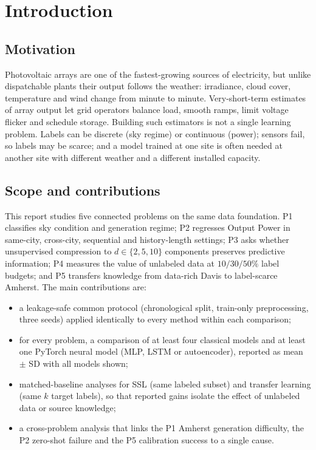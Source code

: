 \documentclass[11pt,letterpaper]{article}
\begin{document}
\section{Introduction}
\subsection{Motivation}
Photovoltaic arrays are one of the fastest-growing sources of electricity, but unlike
dispatchable plants their output follows the weather: irradiance, cloud cover, temperature and
wind change from minute to minute. Very-short-term estimates of array output let grid operators
balance load, smooth ramps, limit voltage flicker and schedule storage.
Building such estimators is not a single learning problem. Labels can be discrete (sky regime)
or continuous (power); sensors fail, so labels may be scarce; and a model trained at one site is
often needed at another site with different weather and a different installed capacity.

\subsection{Scope and contributions}
This report studies five connected problems on the same data foundation. P1 classifies sky
condition and generation regime; P2 regresses Output Power in same-city, cross-city, sequential
and history-length settings; P3 asks whether unsupervised compression to $d\in\{2,5,10\}$
components preserves predictive information; P4 measures the value of unlabeled data at
$10/30/50\%$ label budgets; and P5 transfers knowledge from data-rich Davis to label-scarce
Amherst. The main contributions are:
\begin{itemize}[leftmargin=1.5em,itemsep=2pt]
\item a leakage-safe common protocol (chronological split, train-only preprocessing, three seeds)
applied identically to every method within each comparison;
\item for every problem, a comparison of at least four classical models and at least one PyTorch
neural model (MLP, LSTM or autoencoder), reported as mean $\pm$ SD with all models shown;
\item matched-baseline analyses for SSL (same labeled subset) and transfer learning (same $k$
target labels), so that reported gains isolate the effect of unlabeled data or source knowledge;
\item a cross-problem analysis that links the P1 Amherst generation difficulty, the P2 zero-shot
failure and the P5 calibration success to a single cause.
\end{itemize}
\end{document}
